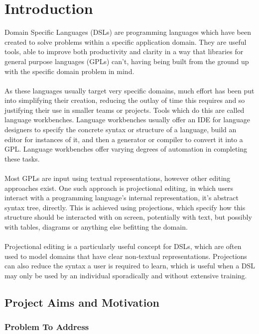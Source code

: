 \documentclass{article}
\begin{document}
\clearpage
\tableofcontents
\clearpage

\section{Introduction}

Domain Specific Languages (DSLs) are programming languages which have been created to solve problems within a specific application domain. They are useful tools, able to improve both productivity and clarity in a way that libraries for general purpose languages (GPLs) can't, having being built from the ground up with the specific domain problem in mind. 
\\
\\
As these languages usually target very specific domains, much effort has been put into simplifying their creation, reducing the outlay of time this requires and so justifying their use in smaller teams or projects. Tools which do this are called language workbenches. Language workbenches usually offer an IDE for language designers to specify the concrete syntax or structure of a language, build an editor for instances of it, and then a generator or compiler to convert it into a GPL. Language workbenches offer varying degrees of automation in completing these tasks.
\\
\\
Most GPLs are input using textual representations, however other editing approaches exist. One such approach is projectional editing, in which users interact with a programming language's internal representation, it's abstract syntax tree, directly. This is achieved using projections, which specify how this structure should be interacted with on screen, potentially with text, but possibly with tables, diagrams or anything else befitting the domain. 
\\
\\
Projectional editing is a particularly useful concept for DSLs, which are often used to model domains that have clear non-textual representations. Projections can also reduce the syntax a user is required to learn, which is useful when a DSL may only be used by an individual sporadically and without extensive training.

\subsection{Project Aims and Motivation}

\subsubsection{Problem To Address}\label{problem}
\end{document}

